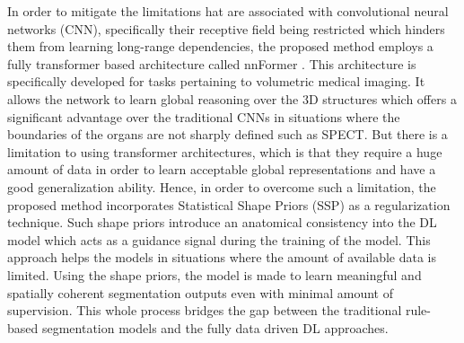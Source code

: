 In order to mitigate the limitations hat are associated with convolutional neural networks (CNN), specifically their receptive field being restricted which hinders them from learning long-range dependencies, the proposed method employs a fully transformer based architecture called nnFormer \cite{zhou2023nnformer}. This architecture is specifically developed for tasks pertaining to volumetric medical imaging. It allows the network to learn global reasoning over the 3D structures which offers a significant advantage over the traditional CNNs in situations where the boundaries of the organs are not sharply defined such as SPECT. But there is a limitation to using transformer architectures, which is that they require a huge amount of data in order to learn acceptable global representations and have a good generalization ability. Hence, in order to overcome such a limitation, the proposed method incorporates Statistical Shape Priors (SSP) as a regularization technique. Such shape priors introduce an anatomical consistency into the DL model which acts as a guidance signal during the training of the model. This approach helps the models in situations where the amount of available data is limited. Using the shape priors, the model is made to learn meaningful and spatially coherent segmentation outputs even with minimal amount of supervision. This whole process bridges the gap between the traditional rule-based segmentation models and the fully data driven DL approaches.
